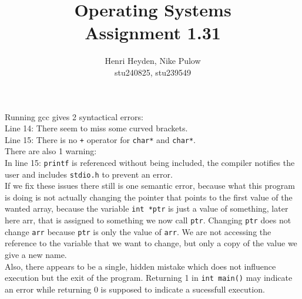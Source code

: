 \documentclass[12pt, a4paper]{article}
\title{Operating Systems\\Assignment 1.31}
\author{Henri Heyden, Nike Pulow \\ \small stu240825, stu239549}
\date{}
\begin{document}
\maketitle

\singlespacing
\subsubsection*{}
Running gcc gives 2 syntactical errors: \\
Line 14: There seem to miss some curved brackets. \\
Line 15: There is no \verb|+| operator for \verb|char*| and \verb|char*|. \\
There are also 1 warning: \\
In line 15: \verb|printf| is referenced without being included, the compiler notifies the user and includes \verb|stdio.h| to prevent an error. \\
If we fix these issues there still is one semantic error, because what this program is doing is not actually changing the pointer that points to the first value of the wanted array, because the variable \verb|int *ptr| is just a value of something, later here arr, that is assigned to something we now call \verb|ptr|. Changing \verb|ptr| does not change \verb|arr| because \verb|ptr| is only the value of \verb|arr|. We are not accessing the reference to the variable that we want to change, but only a copy of the value we give a new name. \\
Also, there appears to be a single, hidden mistake which does not influence execution but the exit of the program. Returning 1 in \verb|int main()| may indicate an error while returning 0 is supposed to indicate a sucessfull execution.
\end{document}
